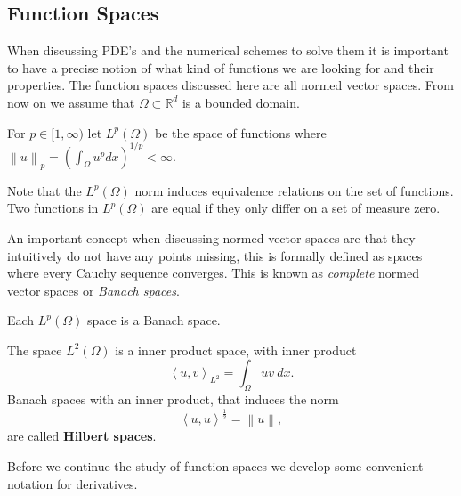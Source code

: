 \documentclass[../Main/main.tex]{subfiles}
\begin{document}
	
	\subsection{Function Spaces}

	When discussing PDE's and the numerical schemes to solve them it is important to have a precise notion of what kind of functions we are looking for and their properties. The function spaces discussed here are all normed vector spaces. From now on we assume that $\Omega \subset \mathbb{R}^d$ is a bounded domain.
	\begin{definition}
		For $p\in [1,\infty)$ let $L^p(\Omega)$ be the space of functions where  $\left \| u \right \|_p = (\int_{\Omega} u^pdx)^{1/p} <\infty$.
	\end{definition}

	\begin{remark}
		Note that the $L^p(\Omega)$ norm induces equivalence relations on the set of functions. Two functions in $L^p(\Omega)$ are equal if they only differ on a set of measure zero.
	\end{remark}
	An important concept when discussing normed vector spaces are that they intuitively do not have any points missing, this is formally defined as spaces where every Cauchy sequence converges. This is known as \emph{complete} normed vector spaces or \emph{Banach spaces}.
	
	\begin{theorem}\label{theorem:Riesz-Fischer}
		Each $L^p(\Omega)$ space is a Banach space.
	\end{theorem}
	\begin{remark}
		The space $L^2(\Omega)$ is a inner product space, with inner product
		\begin{equation*}
			\left \langle u,v\right \rangle_{L^2} = \int_{\Omega}uv \ dx.
		\end{equation*}
		 Banach spaces with an inner product, that induces the norm 
		\begin{equation*}
			\left \langle u,u \right \rangle ^{\frac{1}{2}} = \left \| u \right \|,
		\end{equation*}
		are called \textbf{Hilbert spaces}. 
	\end{remark}
	
	
	
	
	Before we continue the study of function spaces we develop some convenient notation for derivatives.
	
\end{document}
